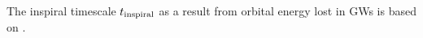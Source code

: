 \documentclass[twocolumn]{aastex63}
\newcommand{\floor}[1]{\textbf{\textcolor{magenta}{[Floor: #1]}}}
\newcommand{\Msun}{\ensuremath{\,\rm{M}_{\odot}}\xspace}
\newcommand{\Kelvin}{\ensuremath{\,\mathrm{K}}\xspace}
\newcommand{\yearmin}{\ensuremath{\,\rm{yr}^{-1}}\xspace}
\newcommand{\tinspiral}{\ensuremath{{t}_{\rm{inspiral}}}\xspace}
\begin{document}
The inspiral timescale $\tinspiral$ 
as a result from orbital energy lost in \acp{GW}  is based on \citet{1964PhRv..136.1224P}.


%
%	
\end{document}
